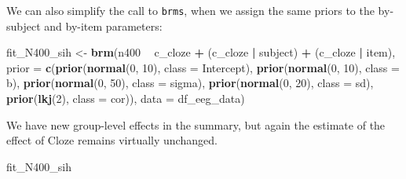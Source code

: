\documentclass[12pt,]{krantz}
\newenvironment{Shaded}{\begin{snugshade}}{\end{snugshade}}
\newcommand{\DataTypeTok}[1]{\textcolor[rgb]{0.13,0.29,0.53}{#1}}
\newcommand{\DecValTok}[1]{\textcolor[rgb]{0.00,0.00,0.81}{#1}}
\newcommand{\KeywordTok}[1]{\textcolor[rgb]{0.13,0.29,0.53}{\textbf{#1}}}
\newcommand{\NormalTok}[1]{#1}
\newcommand{\OperatorTok}[1]{\textcolor[rgb]{0.81,0.36,0.00}{\textbf{#1}}}
\newcommand{\StringTok}[1]{\textcolor[rgb]{0.31,0.60,0.02}{#1}}
\theoremstyle{definition}
\theoremstyle{definition}
\theoremstyle{definition}
\theoremstyle{remark}
\begin{document}
We can also simplify the call to \texttt{brms}, when we assign the same priors to the by-subject and by-item parameters:

\begin{Shaded}
\begin{Highlighting}[]
\NormalTok{fit_N400_sih <-}\StringTok{ }\KeywordTok{brm}\NormalTok{(n400 }\OperatorTok{~}\StringTok{ }\NormalTok{c_cloze }\OperatorTok{+}\StringTok{ }\NormalTok{(c_cloze }\OperatorTok{|}\StringTok{ }\NormalTok{subject) }\OperatorTok{+}\StringTok{ }\NormalTok{(c_cloze }\OperatorTok{|}\StringTok{ }\NormalTok{item),}
                  \DataTypeTok{prior =}
                      \KeywordTok{c}\NormalTok{(}\KeywordTok{prior}\NormalTok{(}\KeywordTok{normal}\NormalTok{(}\DecValTok{0}\NormalTok{, }\DecValTok{10}\NormalTok{), }\DataTypeTok{class =}\NormalTok{ Intercept),}
                        \KeywordTok{prior}\NormalTok{(}\KeywordTok{normal}\NormalTok{(}\DecValTok{0}\NormalTok{, }\DecValTok{10}\NormalTok{), }\DataTypeTok{class =}\NormalTok{ b),}
                        \KeywordTok{prior}\NormalTok{(}\KeywordTok{normal}\NormalTok{(}\DecValTok{0}\NormalTok{, }\DecValTok{50}\NormalTok{), }\DataTypeTok{class =}\NormalTok{ sigma),}
                        \KeywordTok{prior}\NormalTok{(}\KeywordTok{normal}\NormalTok{(}\DecValTok{0}\NormalTok{, }\DecValTok{20}\NormalTok{), }\DataTypeTok{class =}\NormalTok{ sd),}
                        \KeywordTok{prior}\NormalTok{(}\KeywordTok{lkj}\NormalTok{(}\DecValTok{2}\NormalTok{), }\DataTypeTok{class =}\NormalTok{ cor)),}
                  \DataTypeTok{data =}\NormalTok{ df_eeg_data)}
\end{Highlighting}
\end{Shaded}

We have new group-level effects in the summary, but again the estimate of the effect of Cloze remains virtually unchanged.

\begin{Shaded}
\begin{Highlighting}[]
\NormalTok{fit_N400_sih}
\end{Highlighting}
\end{Shaded}
\end{document}
